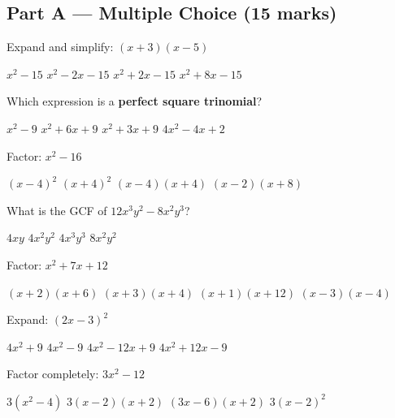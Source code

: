 \documentclass[addpoints]{exam}
\begin{document}
\newpage
\begin{questions}

\section*{Part A --- Multiple Choice (15 marks)}
\vspace{5mm}

\question[1] Expand and simplify: $(x + 3)(x - 5)$
\begin{choices}
    \choice $x^2 - 15$
    \correctchoice $x^2 - 2x - 15$
    \choice $x^2 + 2x - 15$
    \choice $x^2 + 8x - 15$
\end{choices}
\vspace{3mm}

\question[1] Which expression is a \textbf{perfect square trinomial}?
\begin{choices}
    \choice $x^2 - 9$
    \correctchoice $x^2 + 6x + 9$
    \choice $x^2 + 3x + 9$
    \choice $4x^2 - 4x + 2$
\end{choices}
\vspace{3mm}

\question[1] Factor: $x^2 - 16$
\begin{choices}
    \choice $(x - 4)^2$
    \choice $(x + 4)^2$
    \correctchoice $(x-4)(x+4)$
    \choice $(x - 2)(x + 8)$
\end{choices}
\vspace{3mm}

\question[1] What is the GCF of $12x^3y^2 - 8x^2y^3$?
\begin{choices}
    \choice $4xy$
    \correctchoice $4x^2y^2$
    \choice $4x^3y^3$
    \choice $8x^2y^2$
\end{choices}
\vspace{3mm}

\question[1] Factor: $x^2 + 7x + 12$
\begin{choices}
    \choice $(x + 2)(x + 6)$
    \correctchoice $(x + 3)(x + 4)$
    \choice $(x + 1)(x + 12)$
    \choice $(x - 3)(x - 4)$
\end{choices}
\vspace{3mm}

\question[1] Expand: $(2x - 3)^2$
\begin{choices}
    \choice $4x^2 + 9$
    \choice $4x^2 - 9$
    \correctchoice $4x^2 - 12x + 9$
    \choice $4x^2 + 12x - 9$
\end{choices}
\vspace{3mm}

\question[1] Factor completely: $3x^2 - 12$
\begin{choices}
    \choice $3(x^2 - 4)$
    \correctchoice $3(x-2)(x+2)$
    \choice $(3x - 6)(x + 2)$
    \choice $3(x - 2)^2$
\end{choices}
\vspace{3mm}


\end{questions}
\end{document}
